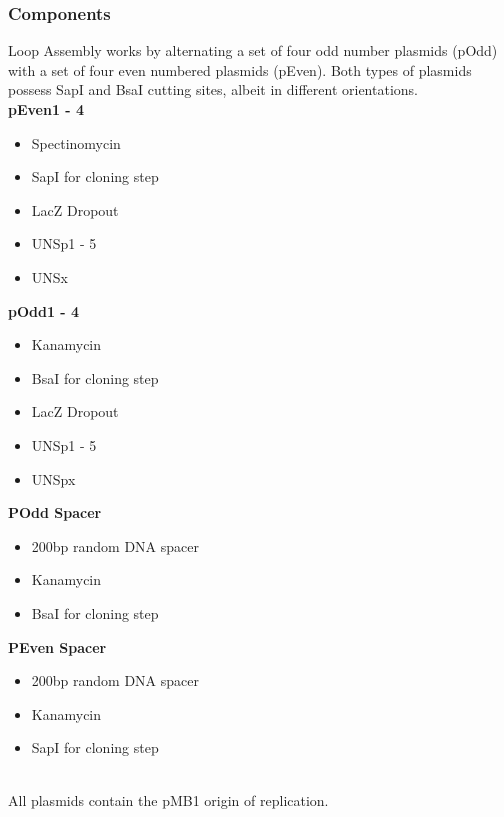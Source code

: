 \subsubsection{Components}
Loop Assembly works by alternating a set of four odd number plasmids (pOdd) with a set of four even numbered plasmids (pEven). Both types of plasmids possess SapI and BsaI cutting sites, albeit in different orientations. \\ 

\textbf{pEven1 - 4}
\begin{itemize}[noitemsep,topsep=0pt]
    \item Spectinomycin
    \item SapI for cloning step
    \item LacZ Dropout
    \item UNSp1 - 5
    \item UNSx
\end{itemize} 


\textbf{pOdd1 - 4}
\begin{itemize}[noitemsep,topsep=0pt]
    \item Kanamycin
    \item BsaI for cloning step
    \item LacZ Dropout
    \item UNSp1 - 5
    \item UNSpx
\end{itemize}  


\textbf{POdd Spacer}
\begin{itemize}[noitemsep,topsep=0pt]
    \item 200bp random DNA spacer
    \item Kanamycin
    \item BsaI for cloning step
\end{itemize} 


\textbf{PEven Spacer}
\begin{itemize}[noitemsep,topsep=0pt]
    \item 200bp random DNA spacer
    \item Kanamycin
    \item SapI for cloning step
\end{itemize} 
\mbox{} \\
All plasmids contain the pMB1 origin of replication.

